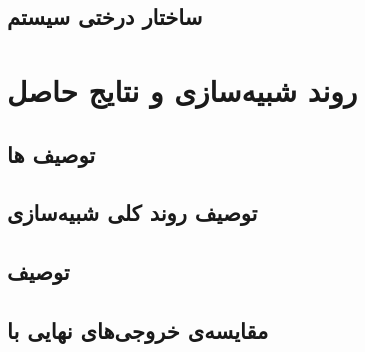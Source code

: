 \documentclass[]{article}
\begin{document}
\subsection{ساختار درختی سیستم}

\pagebreak
\section{روند شبیه‌سازی و نتایج حاصل}
\subsection{توصیف ها}
\subsection{توصیف روند کلی شبیه‌سازی}
\subsection{توصیف }
\subsection{مقایسه‌ی خروجی‌های نهایی با }
\end{document}
